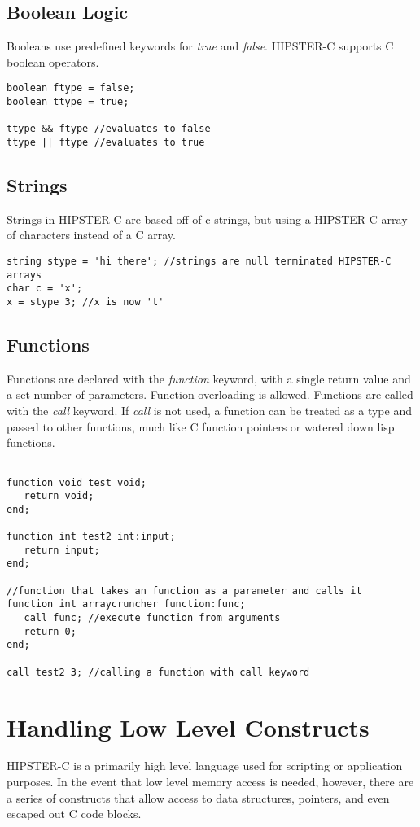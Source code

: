 \documentclass{article}
\begin{document}
\subsection{Boolean Logic}
Booleans use predefined keywords for \textit{true} and \textit{false}. HIPSTER-C supports C boolean operators. 
\begin{verbatim}
boolean ftype = false; 
boolean ttype = true; 

ttype && ftype //evaluates to false
ttype || ftype //evaluates to true
\end{verbatim}


\subsection{Strings}
Strings in HIPSTER-C are based off of c strings, but using a HIPSTER-C array of characters instead of a C array. 
\begin{verbatim}
string stype = 'hi there'; //strings are null terminated HIPSTER-C arrays
char c = 'x';
x = stype 3; //x is now 't'
\end{verbatim}


\subsection{Functions}
Functions are declared with the \textit{function} keyword, with a single return value and a set number of parameters. Function overloading is allowed. Functions are called with the \textit{call} keyword. If \textit{call} is not used, a function can be treated as a type and passed to other functions, much like C function pointers or watered down lisp functions. 
\begin{verbatim}

function void test void; 
   return void;
end;

function int test2 int:input; 
   return input;
end;

//function that takes an function as a parameter and calls it
function int arraycruncher function:func;
   call func; //execute function from arguments 
   return 0;
end; 

call test2 3; //calling a function with call keyword
\end{verbatim}



\section{Handling Low Level Constructs}
HIPSTER-C is a primarily high level language used for scripting or application purposes. In the event that low level memory access is needed, however, there are a series of constructs that allow access to data structures, pointers, and even escaped out C code blocks. 
\end{document}
